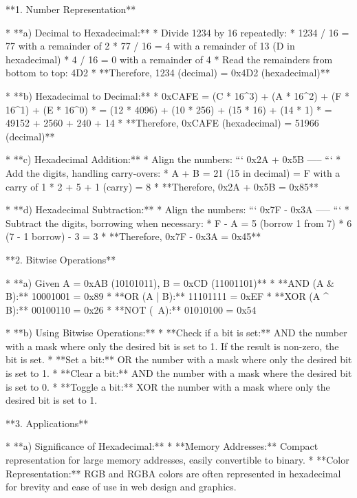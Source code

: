 **1. Number Representation**

*   **a) Decimal to Hexadecimal:**
    *   Divide 1234 by 16 repeatedly:
        *   1234 / 16 = 77 with a remainder of 2
        *   77 / 16 = 4 with a remainder of 13 (D in hexadecimal)
        *   4 / 16 = 0 with a remainder of 4
    *   Read the remainders from bottom to top: 4D2
    *   **Therefore, 1234 (decimal) = 0x4D2 (hexadecimal)**

*   **b) Hexadecimal to Decimal:**
    *   0xCAFE = (C * 16^3) + (A * 16^2) + (F * 16^1) + (E * 16^0)
    *   = (12 * 4096) + (10 * 256) + (15 * 16) + (14 * 1)
    *   = 49152 + 2560 + 240 + 14
    *   **Therefore, 0xCAFE (hexadecimal) = 51966 (decimal)**

*   **c) Hexadecimal Addition:**
    *   Align the numbers:
        ```
        0x2A
        + 0x5B
        -----
        ```
    *   Add the digits, handling carry-overs:
        *   A + B = 21 (15 in decimal) = F with a carry of 1
        *   2 + 5 + 1 (carry) = 8
    *   **Therefore, 0x2A + 0x5B = 0x85**

*   **d) Hexadecimal Subtraction:**
    *   Align the numbers:
        ```
        0x7F
        - 0x3A
        -----
        ```
    *   Subtract the digits, borrowing when necessary:
        *   F - A = 5 (borrow 1 from 7)
        *   6 (7 - 1 borrow) - 3 = 3
    *   **Therefore, 0x7F - 0x3A = 0x45**

**2. Bitwise Operations**

*   **a) Given A = 0xAB (10101011), B = 0xCD (11001101)**
    *   **AND (A & B):** 10001001 = 0x89
    *   **OR (A | B):** 11101111 = 0xEF
    *   **XOR (A ^ B):** 00100110 = 0x26
    *   **NOT (~A):** 01010100 = 0x54

*   **b) Using Bitwise Operations:**
    *   **Check if a bit is set:** AND the number with a mask where only the desired bit is set to 1. If the result is non-zero, the bit is set.
    *   **Set a bit:** OR the number with a mask where only the desired bit is set to 1.
    *   **Clear a bit:** AND the number with a mask where the desired bit is set to 0.
    *   **Toggle a bit:** XOR the number with a mask where only the desired bit is set to 1.

**3. Applications**

*   **a) Significance of Hexadecimal:**
    *   **Memory Addresses:** Compact representation for large memory addresses, easily convertible to binary.
    *   **Color Representation:** RGB and RGBA colors are often represented in hexadecimal for brevity and ease of use in web design and graphics.

